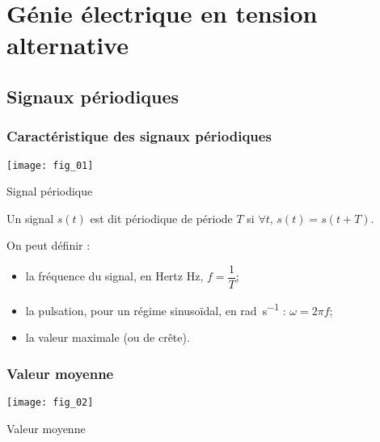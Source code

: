 \setchapterpreamble[u]{\margintoc}

\chapter{Génie électrique en tension alternative}




\section{Signaux périodiques}

\subsection{Caractéristique des signaux périodiques}

\begin{marginfigure}
\texttt{[image: fig\_01]}
\caption{Signal périodique \label{fig:ge:cours:01}}
\end{marginfigure}

\begin{defi}
Un signal $s(t)$ est dit périodique de période $T$ si $\forall t$, $s(t)=s(t+T)$.
\end{defi}

\begin{defi}[Caractéristiques]
On peut définir : 
\begin{itemize}
\item la fréquence du signal, en Hertz \si{Hz}, $f=\dfrac{1}{T}$;
\item la pulsation, pour un régime sinusoïdal, en \si{rad.s^{-1}} :  $\omega = 2\pi f$;
\item la valeur maximale (ou de crête). 
\end{itemize}
\end{defi}

\subsection{Valeur moyenne}
\begin{marginfigure}
\texttt{[image: fig\_02]}
\caption{Valeur moyenne\label{fig:ge:cours:02}}
\end{marginfigure}



